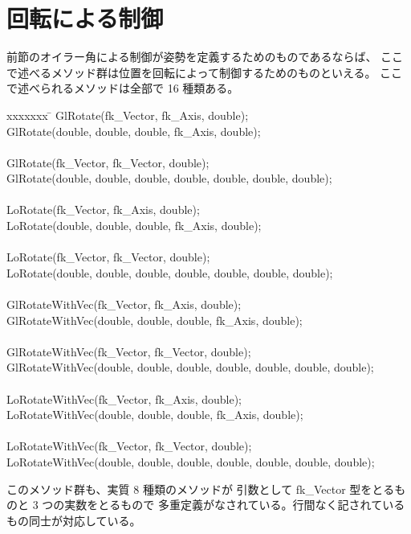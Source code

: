 \section{回転による制御}
前節のオイラー角による制御が姿勢を定義するためのものであるならば、
ここで述べるメソッド群は位置を回転によって制御するためのものといえる。
ここで述べられるメソッドは全部で 16 種類ある。
\begin{bf}
\begin{tabbing}
xxxxxxx \= \kill
\> GlRotate(fk\_Vector, fk\_Axis, double); \\
\> GlRotate(double, double, double, fk\_Axis, double); \\
\\
\> GlRotate(fk\_Vector, fk\_Vector, double); \\
\> GlRotate(double, double, double, double, double, double, double); \\
\\
\> LoRotate(fk\_Vector, fk\_Axis, double); \\
\> LoRotate(double, double, double, fk\_Axis, double); \\
\\
\> LoRotate(fk\_Vector, fk\_Vector, double); \\
\> LoRotate(double, double, double, double, double, double, double); \\
\\
\> GlRotateWithVec(fk\_Vector, fk\_Axis, double); \\
\> GlRotateWithVec(double, double, double, fk\_Axis, double); \\
\\
\> GlRotateWithVec(fk\_Vector, fk\_Vector, double); \\
\> GlRotateWithVec(double, double, double, double, double, double, double); \\
\\
\> LoRotateWithVec(fk\_Vector, fk\_Axis, double); \\
\> LoRotateWithVec(double, double, double, fk\_Axis, double); \\
\\
\> LoRotateWithVec(fk\_Vector, fk\_Vector, double); \\
\> LoRotateWithVec(double, double, double, double, double, double, double); \\
\end{tabbing}
\end{bf}
このメソッド群も、実質 8 種類のメソッドが
引数として fk\_Vector 型をとるものと 3 つの実数をとるもので
多重定義がなされている。行間なく記されているもの同士が対応している。

